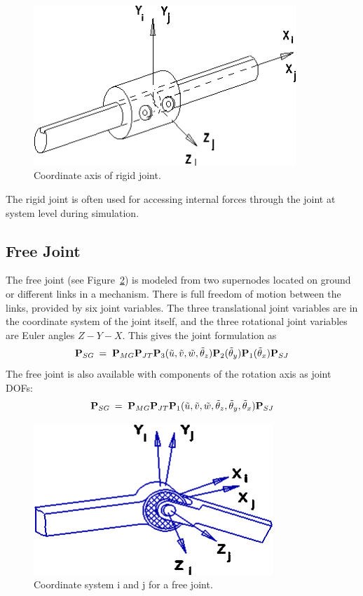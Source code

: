 \begin{figure}[t]
\center\includegraphics[width=3.9in]{Figures/rigidJoint.png}
\caption{Coordinate axis of rigid joint.}
\label{fig:RigidJoint}
\end{figure}

The rigid joint is often used for accessing internal forces through the
joint at system level during simulation.


\subsection{Free Joint}
\label{subs:Free Joint}

The free joint (see Figure~\ref{fig:FreeJoint}) is modeled from two supernodes
located on ground or different links in a mechanism.
There is full freedom of motion between the links,
provided by six joint variables.
The three translational joint variables are in the coordinate system of the
joint itself, and the three rotational joint variables are Euler angles $Z-Y-X$.
This gives the joint formulation as
%
\begin{equation}
{\bf P}_{SG} \:=\; {\bf P}_{MG}{\bf P}_{JT}
{\bf P}_3(\tilde u,\tilde v,\tilde w,\tilde\theta_z)
{\bf P}_2(\tilde\theta_y)
{\bf P}_1(\tilde\theta_x)
{\bf P}_{SJ}
\label{eq:FreeJoint}
\end{equation}
%
The free joint is also available with components of the rotation
axis as joint DOFs:
%
\begin{equation}
{\bf P}_{SG} \:=\; {\bf P}_{MG}{\bf P}_{JT}
{\bf P}_1(\tilde u,\tilde v,\tilde w,\tilde\theta_z,\tilde\theta_y,\tilde\theta_x)
{\bf P}_{SJ}
\label{eq:FreeJoint2}
\end{equation}

\begin{figure}[t]
\center\includegraphics[width=3.55in]{Figures/freeJoint.png}
\caption{Coordinate system i and j for a free joint.}
\label{fig:FreeJoint}
\end{figure}

